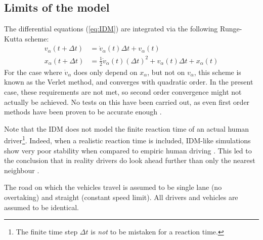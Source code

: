 \subsection{Limits of the model}
The differential equations (\ref{eq:IDM}) are integrated via the following Runge-Kutta scheme:
\begin{align*}
v_\alpha(t+\Delta t) &= \dot v_\alpha(t)\Delta t+v_\alpha(t) \\
x_\alpha(t+\Delta t) &= \frac{1}{2}\dot v_\alpha(t) (\Delta t)^2 + v_\alpha(t)\Delta t + x_\alpha(t)
\end{align*}
For the case where $\dot v_\alpha$ does only depend on $x_\alpha$, but not on $v_\alpha$, this scheme is known as the Verlet method, and converges with quadratic order. In the present case, these requirements are not met, so second order convergence might not actually be achieved. No tests on this have been carried out, as even first order methods have been proven to be accurate enough \cite{treiber2015}.

Note that the IDM does not model the finite reaction time of an actual human driver\footnote{The finite time step $\Delta t$ is \emph{not} to be mistaken for a reaction time.}. Indeed, when a realistic reaction time is included, IDM-like simulations show very poor stability when compared to empiric human driving . This led to the conclusion that in reality drivers do look ahead further than only the nearest neighbour \cite{treiber2006}.

The road on which the vehicles travel is assumed to be single lane (no overtaking) and straight (constant speed limit). All drivers and vehicles are assumed to be identical.